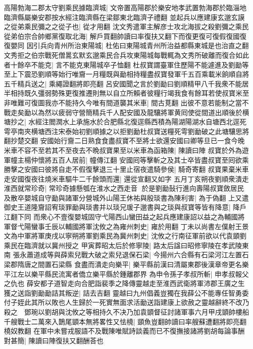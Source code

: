 高陽勃海二郡太守劉乘民據臨濟城|{
	文帝置高陽郡於樂安地孝武置勃海郡於臨淄地臨濟縣屬樂安郡按水經注臨濟縣在梁鄒東北臨濟子禮翻}
並起兵以應建康玄邈玄謨之從弟乘民彌之之從子也|{
	從才用翻}
沈文秀遣軍主解彦士攻北海拔之殺劉彌之乘民從弟伯宗合帥鄉黨復取北海|{
	解戶買翻帥讀曰率復扶又翻下而復更復可復假復國復復嬰同}
因引兵向青州所治東陽城|{
	杜佑曰東陽城青州所治益都縣東城是也治直之翻}
文秀拒之伯宗戰死僧暠玄默玄邈乘民合兵攻東陽城每戰輒為文秀所破離而復合如此者十餘卒不能克|{
	言不能克東陽城卒子恤翻}
杜叔寶謂臺軍住歷陽不能遽進及劉勔等至上下震恐劉順等始行唯齎一月糧既與勔相持糧盡叔寶發軍千五百乘載米餉順自將五千精兵送之|{
	乘繩證翻將即亮翻}
呂安國聞之言於劉勔曰劉順精甲八千我衆不能居半相持既久彊弱勢殊更復推遷則無以自立所賴者彼糧行竭我食有餘耳若使叔寶米至非唯難可復圖我亦不能持久今唯有間道襲其米車|{
	間古莧翻}
出彼不意若能制之當不戰走矣勔以為然以疲弱守營簡精兵千人配安國及龍驤將軍黄囘使從間道出順後於横塘抄之|{
	水經注閻潤水上承施水於合肥縣北復逕縣西積為陽湖陽湖水自塘西北逕死雩亭南夾横塘西注宋泰始初劉順據之以拒劉勔杜叔寶送糧死雩劉勔破之此塘驤思將翻抄楚交翻}
安國始行齎二日熟食食盡叔寶不至將士欲還安國曰卿等旦已一食今晚米車不容不至若其不至夜去不晩叔寶果至以米車為函箱陳|{
	陳讀曰陣}
叔寶於外為遊軍幢主楊仲懷將五百人居前|{
	幢傳江翻}
安國囘等擊斬之及其士卒皆盡叔寶至囘欲乘勝擊之安國曰彼將自走不假復擊退三十里止宿夜遣騎參侯|{
	騎奇寄翻}
叔寶果棄米車走安國復夜往燒米車驅牛二千餘頭而還|{
	還從宣翻又如字}
五月丁亥朔夜劉順衆潰走淮西就常珍奇|{
	常珍奇據懸瓠在淮水之西走音}
於是劉勔鼔行進向壽陽叔寶斂居民及散卒嬰城自守勔與諸軍分營城外山陽王休祐與殷琰書為陳利害|{
	為于偽翻}
上又遣御史王道隆齎詔宥琰罪勔與琰書并以琰兄瑗子邈書與之琰與叔寶等皆有降意|{
	降戶江翻下同}
而衆心不壹復嬰城固守弋陽西山蠻田益之起兵應建康詔以益之為輔國將軍督弋陽蠻事壬辰以輔國將軍沈攸之為雍州刺史|{
	雍於用翻}
丁未以尚書左僕射王景文為中軍將軍庚戌以寧朔將軍劉乘民為冀州刺史|{
	沈攸之行南征軍前欲以代袁顗劉乘民在臨濟就以冀州授之}
甲寅葬昭太后於修寧陵|{
	路太后諡曰昭修寧陵在孝武陵東南}
張永蕭道成等與薛索兒戰大破之索兒退保石梁|{
	今揚州六合縣有石梁河江左置石梁郡隋唐之間置石梁縣}
食盡而潰走向樂平|{
	樂平縣前漢曰清屬東郡後漢章帝更名樂平江左以樂平縣民流寓者僑立樂平縣於鍾離郡界}
為申令孫子孝叔所斬|{
	申孝叔報父之仇也}
薛安都子道智走向合肥詣裴季之降傳靈越走至淮西武衛將軍沛郡王廣之生獲之送詣劉勔勔詰其叛逆|{
	詰去吉翻}
靈越曰九州倡義豈獨在我薛公不能專任智勇委付子姪此其所以敗也人生歸於一死實無面求活勔送詣建康上欲赦之靈越辭終不改乃殺之　鄧琬以劉胡與沈攸之等相持久不决乃加袁顗督征討諸軍事六月甲戌顗帥樓船千艘戰士二萬來入鵲尾顗本無將畧性又怯橈|{
	顗魚豈翻帥讀曰率艘蘇遭翻將即亮翻橈奴教翻}
在軍中未嘗戎服語不及戰陳唯賦詩談義而已不復撫接諸將劉胡每論事酬對甚簡|{
	陳讀曰陣復扶又翻酬荅也}
